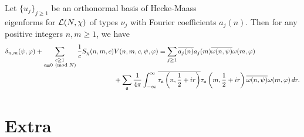 \documentclass[12pt,oneside]{book}
\begin{document}
    \begin{theorem}
      Let $\{u_{j}\}_{j \ge 1}$ be an orthonormal basis of Hecke-Maass \\ eigenforms for $\mathcal{L}(N,\chi)$ of types $\nu_{j}$ with Fourier coefficients $a_{j}(n)$. Then for any positive integers $n,m \ge 1$, we have
      \begin{align*}
        \delta_{n,m}(\psi,\varphi)+\sum_{\substack{c \ge 1 \\ c \equiv 0 \ \left(\text{mod }N\right)}}\frac{1}{c}S_{\chi}(n,m,c)&V(n,m,c,\psi,\varphi) = \sum_{j \ge 1}\overline{a_{j}(n)}a_{j}(m)\overline{\omega(n,\psi)}\omega(m,\varphi) \\
        &+\sum_{\mathfrak{a}}\frac{1}{4\pi}\int_{-\infty}^{\infty}\overline{\tau_{\mathfrak{a}}\left(n,\frac{1}{2}+ir\right)}\tau_{\mathfrak{a}}\left(m,\frac{1}{2}+ir\right)\overline{\omega(n,\psi)}\omega(m,\varphi)\,dr.
      \end{align*}
    \end{theorem}

\section*{Extra}
\end{document}
